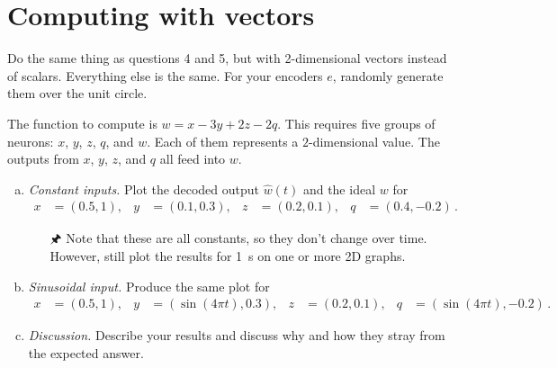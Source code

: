 	\section{Computing with vectors}
	
	Do the same thing as questions 4 and 5, but with 2-dimensional vectors instead of scalars. Everything else is the same. For your encoders $e$, randomly generate them over the unit circle.
	
	The function to compute is $w = x-3y+2z-2q$. This requires five groups of neurons: $x$, $y$, $z$, $q$, and $w$. Each of them represents a $2$-dimensional value. The outputs from $x$, $y$, $z$, and $q$ all feed into $w$.
	
	\begin{enumerate}[a)]
		\item {} \emph{Constant inputs.} Plot the decoded output $\hat{w}(t)$ and the ideal $w$ for
		\begin{align*}
			x &=(0.5,1), & y &= (0.1,0.3), & z &=(0.2,0.1), & q &= (0.4,-0.2) \,.
		\end{align*}
		\begin{itemize}
			\item[{\symbolfont 🖈}] Note that these are all constants, so they don't change over time. However, still plot the results for \SI{1}{\second} on one or more 2D graphs.
		\end{itemize}
		\item {} \emph{Sinusoidal input.} Produce the same plot for
		\begin{align*}
			x &=(0.5,1), & y &= (\sin(4\pi t),0.3), & z &=(0.2,0.1), & q &= (\sin(4\pi t),-0.2) \,.
		\end{align*}
		\item {} \emph{Discussion.} Describe your results and discuss why and how they stray from the expected answer.
	\end{enumerate}

